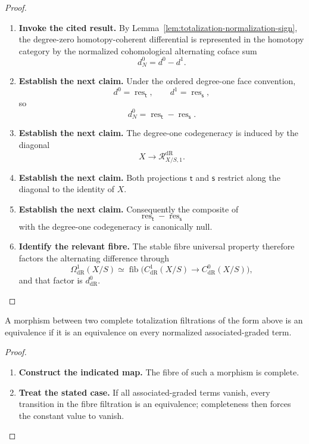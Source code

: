 \begin{proof}
\leavevmode
\begin{enumerate}[label=\textup{(\arabic*)}]
    \item \textbf{Invoke the cited result.}
    By
    Lemma~\ref{lem:totalization-normalization-sign}, the degree-zero homotopy-coherent
    differential is represented in the homotopy category by the normalized
    cohomological alternating coface sum
    \[
    d_N^0=d^0-d^1.
    \]
    \item \textbf{Establish the next claim.}
    Under the ordered degree-one face convention,
    \[
    d^0=\operatorname{res}_{\mathsf t},
    \qquad
    d^1=\operatorname{res}_{\mathsf s},
    \]
    so
    \[
    d_N^0
    =
    \operatorname{res}_{\mathsf t}-\operatorname{res}_{\mathsf s}.
    \]
    \item \textbf{Establish the next claim.}
    The degree-one codegeneracy is induced by the diagonal
    \[
    X\longrightarrow \mathcal R^{\mathrm{dR}}_{X/S,1}.
    \]
    \item \textbf{Establish the next claim.}
    Both projections \(\mathsf t\) and \(\mathsf s\) restrict along the diagonal to the identity of
    \(X\).
    \item \textbf{Establish the next claim.}
    Consequently the composite of
    \[
    \operatorname{res}_{\mathsf t}-\operatorname{res}_{\mathsf s}
    \]
    with the degree-one codegeneracy is canonically null.
    \item \textbf{Identify the relevant fibre.}
    The stable fibre universal
    property therefore factors the alternating difference through
    \[
    \Omega^1_{\mathrm{dR}}(X/S)
    \simeq
    \operatorname{fib}
    \bigl(
    C^1_{\mathrm{dR}}(X/S)
    \longrightarrow
    C^0_{\mathrm{dR}}(X/S)
    \bigr),
    \]
    and that factor is \(d^0_{\mathrm{dR}}\).
\end{enumerate}
\end{proof}

\begin{corollary}
A morphism between two complete totalization filtrations of the form above is an
equivalence if it is an equivalence on every normalized associated-graded term.
\end{corollary}

\begin{proof}
\leavevmode
\begin{enumerate}[label=\textup{(\arabic*)}]
    \item \textbf{Construct the indicated map.}
    The fibre of such a morphism is complete.
    \item \textbf{Treat the stated case.}
    If all associated-graded terms vanish,
    every transition in the fibre filtration is an equivalence; completeness then forces
    the constant value to vanish.
\end{enumerate}
\end{proof}

